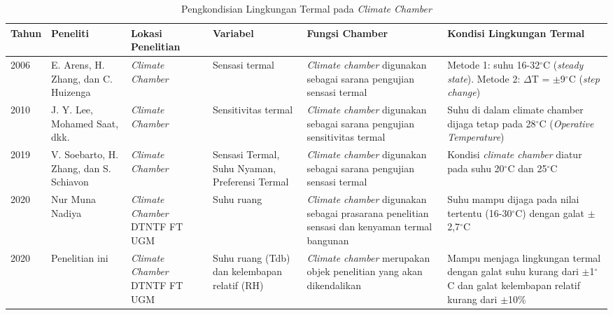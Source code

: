 \begin{landscape}
	\begin{table}[t]
		\caption{Pengkondisian Lingkungan Termal pada \textit{Climate Chamber}}
		\centering
		\label{tbl:2:studichamber}
		\begin{tabular}{|p{1cm}|p{2.6cm}|p{3cm}|p{2.7cm}|p{6cm}|p{5.5cm}|}
			\hline
			Tahun & Peneliti & Lokasi Penelitian & Variabel & Fungsi Chamber & Kondisi Lingkungan Termal \\ \hline
			
			2006 \cite{paper21Arens} & E. Arens, H. Zhang, dan C. Huizenga & \textit{Climate Chamber} & Sensasi termal & \textit{Climate chamber} digunakan sebagai sarana pengujian sensasi termal & Metode 1: suhu 16-32$^{\circ}$C (\textit{steady state}). Metode 2: $\Delta$T = $\pm$9$^{\circ}$C (\textit{step change}) \\ \hline
			
			2010 \cite{paper21JYLee} & J. Y. Lee, Mohamed Saat, dkk. &\textit{Climate Chamber} & Sensitivitas termal & \textit{Climate chamber} digunakan sebagai sarana pengujian sensitivitas termal & Suhu di dalam climate chamber dijaga tetap pada 28$^{\circ}$C (\textit{Operative Temperature}) \\ \hline
			
			2019 \cite{paper21Veronica} & V. Soebarto, H. Zhang, dan S. Schiavon &\textit{Climate Chamber} & Sensasi Termal, Suhu Nyaman, Preferensi Termal & \textit{Climate chamber} digunakan sebagai sarana pengujian sensasi termal & Kondisi \textit{climate chamber} diatur pada suhu 20$^\circ$C dan 25$^\circ$C \\ \hline
			
			2020 \cite{skripsiMuna} & Nur Muna Nadiya & \textit{Climate Chamber} DTNTF FT UGM & Suhu ruang & \textit{Climate chamber} digunakan sebagai prasarana penelitian sensasi dan kenyaman termal bangunan & Suhu mampu dijaga pada nilai tertentu (16-30$^{\circ}$C) dengan galat $\pm$2,7$^{\circ}$C\\ \hline
			
			2020 & Penelitian ini & \textit{Climate Chamber} DTNTF FT UGM & Suhu ruang (Tdb) dan kelembapan relatif (RH) & \textit{Climate chamber} merupakan objek penelitian yang akan dikendalikan & Mampu menjaga lingkungan termal dengan galat suhu kurang dari $\pm$1$^{\circ}$C dan galat kelembapan relatif kurang dari $\pm$10\%\\ \hline
		\end{tabular}
	\end{table}
\end{landscape}

